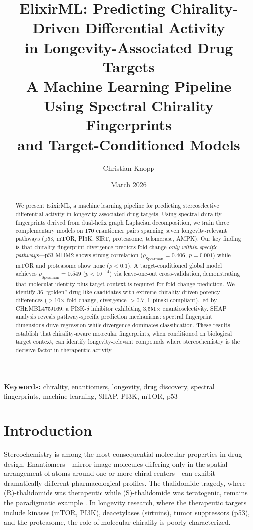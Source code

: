 \documentclass[11pt,a4paper]{article}
\title{%
    \vspace{-1cm}
    \textbf{ElixirML: Predicting Chirality-Driven Differential Activity\\
    in Longevity-Associated Drug Targets}\\[0.5em]
    \large A Machine Learning Pipeline Using Spectral Chirality Fingerprints\\
    and Target-Conditioned Models
}
\author{Christian Knopp}
\affil{cknopp@gmail.com}
\date{March 2026}
\newcommand{\rhosp}{\rho_{\text{Spearman}}}
\begin{document}
\maketitle

\begin{abstract}
\noindent
We present ElixirML, a machine learning pipeline for predicting stereoselective
differential activity in longevity-associated drug targets. Using spectral
chirality fingerprints derived from dual-helix graph Laplacian decomposition,
we train three complementary models on 170 enantiomer pairs spanning seven
longevity-relevant pathways (p53, mTOR, PI3K, SIRT, proteasome, telomerase,
AMPK). Our key finding is that chirality fingerprint divergence predicts
fold-change \emph{only within specific pathways}---p53-MDM2 shows strong
correlation ($\rhosp = 0.406$, $p = 0.001$) while mTOR and proteasome show
none ($\rho < 0.1$). A target-conditioned global model achieves $\rhosp = 0.549$
($p < 10^{-14}$) via leave-one-out cross-validation, demonstrating that molecular
identity plus target context is required for fold-change prediction. We identify
36 ``golden'' drug-like candidates with extreme chirality-driven potency
differences ($>$10$\times$ fold-change, divergence $> 0.7$, Lipinski-compliant),
led by CHEMBL4759169, a PI3K-$\delta$ inhibitor exhibiting 3{,}551$\times$
enantioselectivity. SHAP analysis reveals pathway-specific prediction mechanisms:
spectral fingerprint dimensions drive regression while divergence dominates
classification. These results establish that chirality-aware molecular fingerprints,
when conditioned on biological target context, can identify longevity-relevant
compounds where stereochemistry is the decisive factor in therapeutic activity.
\end{abstract}

\vspace{0.5em}
\noindent\textbf{Keywords:} chirality, enantiomers, longevity, drug discovery,
spectral fingerprints, machine learning, SHAP, PI3K, mTOR, p53

\section{Introduction}

Stereochemistry is among the most consequential molecular properties in drug
design. Enantiomers---mirror-image molecules differing only in the spatial
arrangement of atoms around one or more chiral centers---can exhibit
dramatically different pharmacological profiles. The thalidomide tragedy,
where (R)-thalidomide was therapeutic while (S)-thalidomide was teratogenic,
remains the paradigmatic example \cite{blaschke1979}. In longevity research,
where the therapeutic targets include kinases (mTOR, PI3K), deacetylases
(sirtuins), tumor suppressors (p53), and the proteasome, the role of
molecular chirality is poorly characterized.
\end{document}
